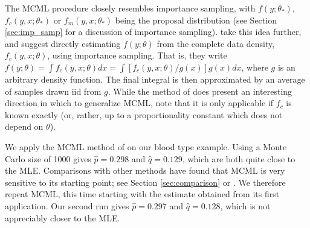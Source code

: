 \documentclass[11pt, oneside]{article}   	%
\begin{document}
The MCML procedure closely resembles importance sampling, with $f(y; \theta_*)$, $f_c(y, x; \theta_*)$ or $f_m(y, x; \theta_*)$ being the proposal distribution (see Section \ref{sec:imp_samp} for a discussion of importance sampling). \citet{Jan03} take this idea further, and suggest directly estimating $f(y; \theta)$ from the complete data density, $f_c(y, x; \theta)$, using importance sampling. That is, they write $f(y; \theta) = \int f_c(y, x; \theta) dx = \int [ f_c(y, x; \theta) / g(x)] g(x) dx$, where $g$ is an arbitrary density function. The final integral is then approximated by an average of samples drawn iid from $g$. While the method of \citeauthor{Jan03} does present an interesting direction in which to generalize MCML, note that it is only applicable if $f_c$ is known exactly (or, rather, up to a proportionality constant which does not depend on $\theta$).

We apply the MCML method of \citet{Gey94} on our blood type example. Using a Monte Carlo size of 1000 gives $\hat{p} = 0.298$ and $\hat{q} = 0.129$, which are both quite close to the MLE. Comparisons with other methods have found that MCML is very sensitive to its starting point; see Section \ref{sec:comparison} or \citet{McC97}. We therefore repeat MCML, this time starting with the estimate obtained from its first application. Our second run gives $\hat{p} = 0.297$ and $\hat{q} = 0.128$, which is not appreciably closer to the MLE.
\end{document}
